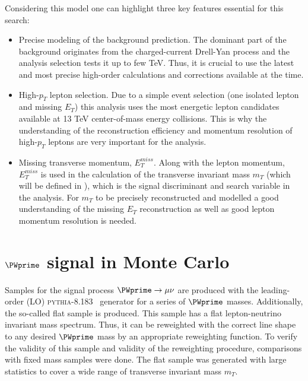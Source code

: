 Considering this model one can highlight three key features essential for this search:
\begin{itemize}
 \item Precise modeling of the background prediction. 
 The dominant part of the background originates from the charged-current Drell-Yan process and the analysis selection tests it up to few TeV.
 Thus, it is crucial to use the latest and most precise high-order calculations and corrections available at the time.
 \item High-$p_T$ lepton selection. Due to a simple event selection (one isolated lepton and missing $E_T$) 
 this analysis uses the most energetic lepton candidates available at 13 TeV center-of-mass energy collisions.
 This is why the understanding of the reconstruction efficiency and momentum resolution of high-$p_T$ leptons are very important for the analysis.
 \item Missing transverse momentum, $E_T^{miss}$. Along with the lepton momentum, $E_T^{miss}$ is used in the calculation of the transverse invariant mass $m_T$ (which will be defined in ),
 which is the signal discriminant and search variable in the analysis. For $m_T$ to be precisely reconstructed and modelled a good understanding of the missing $E_T$ reconstruction as well as good lepton momentum resolution is needed.
\end{itemize}

\section{$\PWprime$ signal in Monte Carlo}
\label{sec:wprimeSignal} 

% 

Samples for the signal process $\PWprime \to \mu \nu$ are produced with the leading-order (LO) 
{\scshape pythia-8.183}~\cite{pythia8} generator for a series of $\PWprime$ masses. 
Additionally, the so-called flat sample is produced. This sample has a flat lepton-neutrino invariant mass spectrum.
Thus, it can be reweighted with the correct line shape to any desired $\PWprime$ mass by an appropriate reweighting function.
To verify the validity of this sample and validity of the reweighting procedure, comparisons with fixed mass samples were done.
The flat sample was generated with large statistics to cover
a wide range of transverse invariant mass $m_T$.

